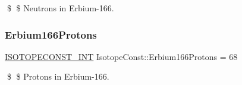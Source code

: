 \$ \$ Neutrons in Erbium-\/166. \mbox{\label{group___isotope_const-_erbium-_er166_ga398930b274df2f3959efec305dd7c4c6}} 
\subsubsection{\texorpdfstring{Erbium166\+Protons}{Erbium166Protons}}
{\footnotesize\ttfamily \mbox{\hyperlink{group___isotope_const-_macros_ga5f18360b3e99483a35c32d789e62621c}{I\+S\+O\+T\+O\+P\+E\+C\+O\+N\+S\+T\+\_\+\+I\+NT}} Isotope\+Const\+::\+Erbium166\+Protons = 68}

\$ \$ Protons in Erbium-\/166. 